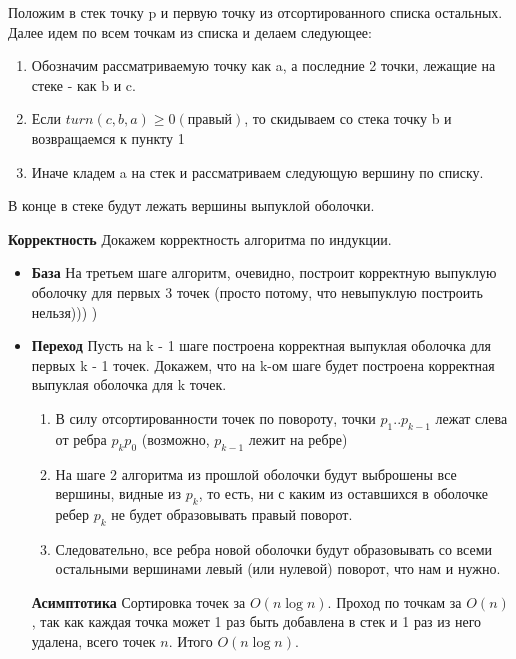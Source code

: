 \documentclass[11pt]{article}
\begin{document}
Положим в стек точку p и первую точку из отсортированного списка остальных. Далее идем
по всем точкам из списка и делаем следующее:

\begin{enumerate}
\item Обозначим рассматриваемую точку как a, а последние 2 точки, лежащие на стеке - как b и c.
\item Если \(turn(c, b, a) \geq 0 (правый)\), то скидываем со стека точку b и возвращаемся к пункту 1
\item Иначе кладем a на стек и рассматриваем следующую вершину по списку.
\end{enumerate}

В конце в стеке будут лежать вершины выпуклой оболочки.

\textbf{Корректность}
Докажем корректность алгоритма по индукции.
\begin{itemize}
\item \textbf{База}
На третьем шаге алгоритм, очевидно, построит корректную выпуклую оболочку для первых 3 точек
(просто потому, что невыпуклую построить нельзя))) )
\item \textbf{Переход}
Пусть на k - 1 шаге построена корректная выпуклая оболочка для первых k - 1 точек.
Докажем, что на k-ом шаге будет построена корректная выпуклая оболочка для k точек.
\begin{enumerate}
\item В силу отсортированности точек по повороту, точки \(p_1 .. p_{k-1}\) лежат слева от ребра
\(p_k p_0\) (возможно, \(p_{k-1}\) лежит на ребре)
\item На шаге 2 алгоритма из прошлой оболочки будут выброшены все вершины, видные из \(p_k\),
то есть, ни с каким из оставшихся в оболочке ребер \(p_k\) не будет образовывать правый поворот.
\item Следовательно, все ребра новой оболочки будут образовывать со всеми остальными вершинами левый (или нулевой)
поворот, что нам и нужно.
\end{enumerate}
\textbf{Асимптотика}
Сортировка точек за \(O(n \log n)\). Проход по точкам за \(O(n)\), так как каждая точка может 1 раз быть
добавлена в стек и 1 раз из него удалена, всего точек \(n\). Итого \(O(n \log n)\).
\end{itemize}
\end{document}
